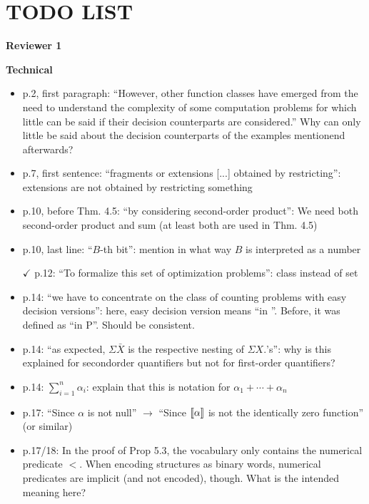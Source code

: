 
\section*{\LARGE \textbf{TODO LIST}}

\bigskip

{\bf Reviewer 1}

\bigskip

{\bf Technical}

\begin{itemize}
	\setlength\itemsep{0.5em}
\item p.2, first paragraph: ``However, other function classes have emerged from the need to understand
the complexity of some computation problems for which little can be said if their
decision counterparts are considered.'' Why can only little be said about the decision counterparts
of the examples mentionend afterwards?
\item p.7, first sentence: ``fragments or extensions [...] obtained by restricting'': extensions are not
obtained by restricting something
\item p.10, before Thm. 4.5: ``by considering second-order product'': We need both second-order
product and sum (at least both are used in Thm. 4.5)
\item p.10, last line: ``$B$-th bit'': mention in what way $B$ is interpreted as a number
\item[$\checkmark$] p.12: ``To formalize this set of optimization problems'': class instead of set
\item p.14: ``we have to concentrate on the class of counting problems with easy decision versions'':
here, easy decision version means ``in \bpp''. Before, it was defined as ``in P''. Should be
consistent.
\item p.14: ``as expected, $\Sigma \bar{X}$ is the respective nesting of $\Sigma X.$’s'': why is this explained for secondorder
quantifiers but not for first-order quantifiers?
\item p.14: $\sum_{i=1}^n\alpha_i$: explain that this is notation for $\alpha_1+\cdots+\alpha_n$
\item p.17: ``Since $\alpha$ is not null'' $\to$ ``Since ${\llbracket{}{\alpha}\rrbracket}$ is not the identically zero function'' (or similar)
\item p.17/18: In the proof of Prop 5.3, the vocabulary only contains the numerical predicate $<$. When encoding structures as binary words, numerical predicates are implicit (and not
encoded), though. What is the intended meaning here?

\end{itemize}

